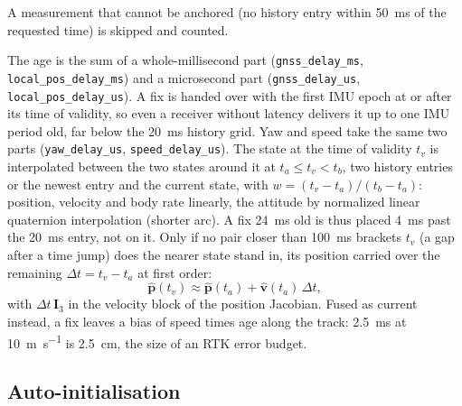 \documentclass[11pt,a4paper]{article}
\newcommand{\vect}[1]{\bm{#1}}
\newcommand{\mat}[1]{\bm{#1}}
\newcommand{\code}[1]{\texttt{#1}}
\begin{document}
A measurement that cannot
be anchored (no history entry within \SI{50}{\milli\second} of the requested
time) is skipped and counted.

The age is the sum of a whole-millisecond part
(\code{gnss\_\allowbreak{}delay\_\allowbreak{}ms},
\code{local\_\allowbreak{}pos\_\allowbreak{}delay\_\allowbreak{}ms}) and a
microsecond part (\code{gnss\_\allowbreak{}delay\_\allowbreak{}us},
\code{local\_\allowbreak{}pos\_\allowbreak{}delay\_\allowbreak{}us}).
A fix is handed over with the first IMU epoch at or after its time of
validity, so even a receiver without latency delivers it up to one IMU period
old, far below the \SI{20}{\milli\second} history grid. Yaw and speed take
the same two parts (\code{yaw\_\allowbreak{}delay\_\allowbreak{}us},
\code{speed\_\allowbreak{}delay\_\allowbreak{}us}). The state at the time of
validity $t_v$ is interpolated between the two states around it at
$t_a \le t_v < t_b$, two history entries or the newest entry and the current
state, with $w = (t_v - t_a)/(t_b - t_a)$: position, velocity and body rate
linearly, the attitude by normalized linear quaternion interpolation (shorter
arc). A fix \SI{24}{\milli\second} old is thus placed \SI{4}{\milli\second}
past the \SI{20}{\milli\second} entry, not on it. Only if no pair closer than
\SI{100}{\milli\second} brackets $t_v$ (a gap after a time jump) does the
nearer state stand in, its position carried over the remaining
$\Delta t = t_v - t_a$ at first order:
\begin{equation}
  \hat{\vect{p}}(t_v) \approx \hat{\vect{p}}(t_a) + \hat{\vect{v}}(t_a)\,\Delta t ,
\end{equation}
with $\Delta t\,\mat{I}_3$ in the velocity block of the position Jacobian.
Fused as current instead, a fix leaves a bias of speed times age along the
track: \SI{2.5}{\milli\second} at \SI{10}{\metre\per\second} is
\SI{2.5}{\centi\metre}, the size of an RTK error budget.

\subsection{Auto-initialisation}
\label{sec:auto-init}
\end{document}
